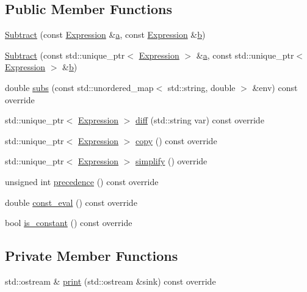 \subsection*{Public Member Functions}
\begin{DoxyCompactItemize}
\item 
\hyperlink{classsymcpp_1_1Subtract_ab77cda12501d9e57a2346eea44e578e2}{Subtract} (const \hyperlink{classsymcpp_1_1Expression}{Expression} \&\hyperlink{classsymcpp_1_1Subtract_a3ef44b38ab098faab493079d994d35ba}{a}, const \hyperlink{classsymcpp_1_1Expression}{Expression} \&\hyperlink{classsymcpp_1_1Subtract_ac5c9bd87c3554a20d9bf12f5a53a9613}{b})
\item 
\hyperlink{classsymcpp_1_1Subtract_a30ad18aceec0bdc15756d2618a8ed6e4}{Subtract} (const std\+::unique\+\_\+ptr$<$ \hyperlink{classsymcpp_1_1Expression}{Expression} $>$ \&\hyperlink{classsymcpp_1_1Subtract_a3ef44b38ab098faab493079d994d35ba}{a}, const std\+::unique\+\_\+ptr$<$ \hyperlink{classsymcpp_1_1Expression}{Expression} $>$ \&\hyperlink{classsymcpp_1_1Subtract_ac5c9bd87c3554a20d9bf12f5a53a9613}{b})
\item 
double \hyperlink{classsymcpp_1_1Subtract_a35a24632dfacadb23e4177a539e7c1df}{subs} (const std\+::unordered\+\_\+map$<$ std\+::string, double $>$ \&env) const override
\item 
std\+::unique\+\_\+ptr$<$ \hyperlink{classsymcpp_1_1Expression}{Expression} $>$ \hyperlink{classsymcpp_1_1Subtract_a4f9040e23694efcf093bf4b5c59b386b}{diff} (std\+::string var) const override
\item 
std\+::unique\+\_\+ptr$<$ \hyperlink{classsymcpp_1_1Expression}{Expression} $>$ \hyperlink{classsymcpp_1_1Subtract_a97b707b4c72caa44342fe7952d616a4d}{copy} () const override
\item 
std\+::unique\+\_\+ptr$<$ \hyperlink{classsymcpp_1_1Expression}{Expression} $>$ \hyperlink{classsymcpp_1_1Subtract_a3d3b5586c41dbbee1071a08db5725ecc}{simplify} () override
\item 
unsigned int \hyperlink{classsymcpp_1_1Subtract_ac0b20c29aac75772aeb226eec86ffc22}{precedence} () const override
\item 
double \hyperlink{classsymcpp_1_1Subtract_a619e8733e2b9c07f9bcdb1c82781fad9}{const\+\_\+eval} () const override
\item 
bool \hyperlink{classsymcpp_1_1Subtract_a651ca7fc5e804970141b65813e738463}{is\+\_\+constant} () const override
\end{DoxyCompactItemize}
\subsection*{Private Member Functions}
\begin{DoxyCompactItemize}
\item 
std\+::ostream \& \hyperlink{classsymcpp_1_1Subtract_a7f0af9519d3a4978abf85e88da7d682d}{print} (std\+::ostream \&sink) const override
\end{DoxyCompactItemize}
